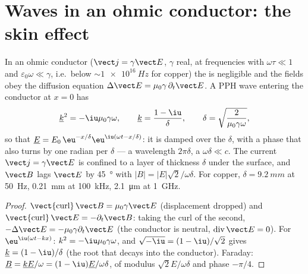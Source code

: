 \section{Waves in an ohmic conductor: the skin effect}

\begin{theorem}\label{thm:b2:waves-in-media:skin}
In an ohmic conductor ($\vect j = \gamma\vect E$, $\gamma$ real, at frequencies
with $\omega\tau \ll 1$ and $\varepsilon_0\omega \ll \gamma$, i.e.\ below $\sim\qty{1e16}{Hz}$ for
copper) the  is negligible and the fields obey the
diffusion equation $\Delta\vect E = \mu_0\gamma\,\partial_t\vect E$. A PPH wave entering
the conductor at $x = 0$ has
\[
\underline k^2 = -\iu\mu_0\gamma\omega , \qquad \underline k = \frac{1 - \iu}\delta , \qquad
\delta = \sqrt{\frac2{\mu_0\gamma\omega}} ,
\]
so that $\underline E = E_0\,\eu^{-x/\delta}\eu^{\iu(\omega t - x/\delta)}$: it is damped
over the \emph{} $\delta$, with a phase that also turns by one
radian per $\delta$ --- a wavelength $2\pi\delta$, a  $\omega\delta \ll
c$. The current $\vect j = \gamma\vect E$ is confined to a layer of thickness
$\delta$ under the surface, and $\vect B$ lags $\vect E$ by \qty{45}{\degree} with
$|B| = |E|\sqrt2/\omega\delta$. For copper, $\delta = \qty{9.2}{mm}$ at \qty{50}{Hz},
\qty{0.21}{mm} at \qty{100}{kHz}, \qty{2.1}{\micro m} at \qty{1}{GHz}.
\end{theorem}

\begin{proof}
$\operatorname{\vect{curl}}\vect B = \mu_0\gamma\vect E$ (displacement dropped) and
$\operatorname{\vect{curl}}\vect E = -\partial_t\vect B$: taking the curl of the second,
$-\Delta\vect E = -\mu_0\gamma\partial_t\vect E$ (the conductor is neutral, $\operatorname{div}
\vect E = 0$). For $\eu^{\iu(\omega t - kx)}$: $k^2 = -\iu\mu_0\gamma\omega$, and
$\sqrt{-\iu} = (1 - \iu)/\sqrt2$ gives $\underline k = (1 - \iu)/\delta$ (the root that
decays into the conductor). Faraday: $\underline B = \underline k\underline E/\omega = (1 - \iu)
\underline E/\omega\delta$, of modulus $\sqrt2E/\omega\delta$ and phase $-\pi/4$.
\end{proof}

